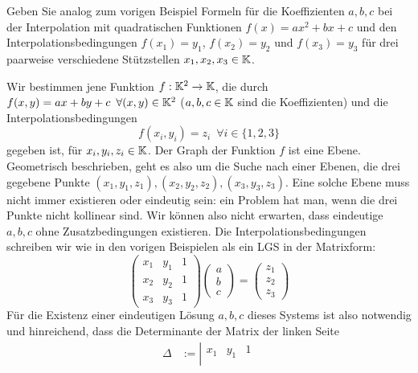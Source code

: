 \begin{bsp}
	Geben Sie analog zum vorigen Beispiel Formeln für die Koeffizienten $a,b,c$ bei der Interpolation mit quadratischen Funktionen $ f(x) = ax^2 + bx + c$ und den Interpolationsbedingungen $f(x_1) = y_1$, $f(x_2) = y_2$ und $f(x_3) = y_3$ für drei paarweise verschiedene Stützstellen $x_1,x_2, x_3 \in \mathbb K$. 
\end{bsp} 


\begin{bsp}
	Wir bestimmen jene Funktion $ f : \mathbb K^2 \to \mathbb K $, die durch $ f(x,y) = ax + by + c \enspace\forall (x,y) \in \mathbb K^2 $  ($ a,b,c \in \mathbb K $ sind die Koeffizienten) und die Interpolationsbedingungen
	\begin{equation*}
		f(x_i,y_i) = z_i \enspace\forall i \in \{ 1,2,3 \}
	\end{equation*}
	gegeben ist, für $ x_i, y_i, z_i \in \mathbb K $. Der Graph der Funktion $f$ ist eine Ebene. Geometrisch beschrieben, geht es also um die Suche nach einer Ebenen, die drei gegebene Punkte $(x_1,y_1,z_1), (x_2, y_2, z_2), (x_3,y_3,z_3)$. Eine solche Ebene muss nicht immer existieren oder eindeutig sein: ein Problem hat man, wenn die drei Punkte nicht kollinear sind. Wir können also nicht erwarten, dass eindeutige $a,b,c$ ohne Zusatzbedingungen existieren. Die Interpolationsbedingungen schreiben wir wie in den vorigen Beispielen als ein LGS in der Matrixform: 
	\begin{equation}
		\begin{pmatrix}
			x_1 & y_1 & 1 \\
			x_2 & y_2 & 1 \\
			x_3 & y_3 & 1
		\end{pmatrix}
		\begin{pmatrix}
			a \\ b \\ c
		\end{pmatrix}
		= \begin{pmatrix}
			z_1 \\ z_2 \\ z_3
		\end{pmatrix}
	\end{equation}
	Für die Existenz einer eindeutigen Lösung $a,b,c$ dieses Systems ist also notwendig und hinreichend, dass die Determinante der Matrix der linken Seite
	\begin{align*}
		\Delta &:= \left| \begin{matrix}
			x_1 & y_1 & 1 \\

\end{matrix}
\end{align*}
\end{bsp}
